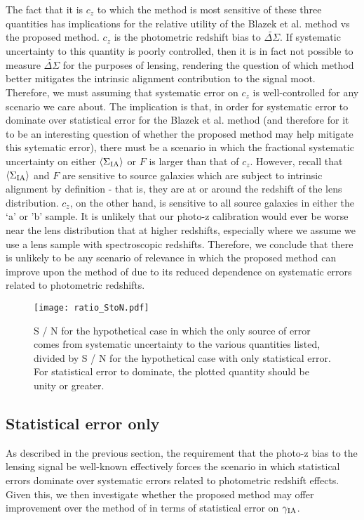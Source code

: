 \documentclass[twocolumn,amsmath,aps,fleqn, superscriptaddress]{revtex4}
\begin{document}
The fact that it is $c_z$ to which the method is most sensitive of these three quantities has implications for the relative utility of the Blazek et al. method vs the proposed method. $c_z$ is the photometric redshift bias to $\tilde{\Delta \Sigma}$. If systematic uncertainty to this quantity is poorly controlled, then it is in fact not possible to measure $\tilde{\Delta \Sigma}$ for the purposes of lensing, rendering the question of which method better mitigates the intrinsic alignment contribution to the signal moot. Therefore, we must assuming that systematic error on $c_z$ is well-controlled for any scenario we care about. The implication is that, in order for systematic error to dominate over statistical error for the Blazek et al. method (and therefore for it to be an interesting question of whether the proposed method may help mitigate this sytematic error), there must be a scenario in which the fractional systematic uncertainty on either $\langle \Sigma_{\rm IA} \rangle$ or $F$ is larger than that of $c_z$. However, recall that $\langle \Sigma_{\rm IA} \rangle$ and $F$ are sensitive to source galaxies which are subject to intrinsic alignment by definition - that is, they are at or around the redshift of the lens distribution. $c_z$, on the other hand, is sensitive to all source galaxies in either the `a' or 'b' sample. It is unlikely that our photo-z calibration would ever be worse near the lens distribution that at higher redshifts, especially where we assume we use a lens sample with spectroscopic redshifts. Therefore, we conclude that there is unlikely to be any scenario of relevance in which the proposed method can improve upon the method of \cite{Blazek2012} due to its reduced dependence on systematic errors related to photometric redshifts.

\begin{figure*}
\centering
\texttt{[image: ratio\_StoN.pdf]}
\caption{S / N for the hypothetical case in which the only source of error comes from systematic uncertainty to the various quantities listed, divided by S / N for the hypothetical case with only statistical error. For statistical error to dominate, the plotted quantity should be unity or greater.}
\label{fig:StoNsysvstat}
\end{figure*}

\subsection{Statistical error only}
\label{subsec:results_stat}
\noindent
As described in the previous section, the requirement that the photo-z bias to the lensing signal be well-known effectively forces the scenario in which statistical errors dominate over systematic errors related to photometric redshift effects. Given this, we then investigate whether the proposed method may offer improvement over the method of \cite{Blazek2012} in terms of statistical error on $\gamma_{\rm IA}$. 
\end{document}
